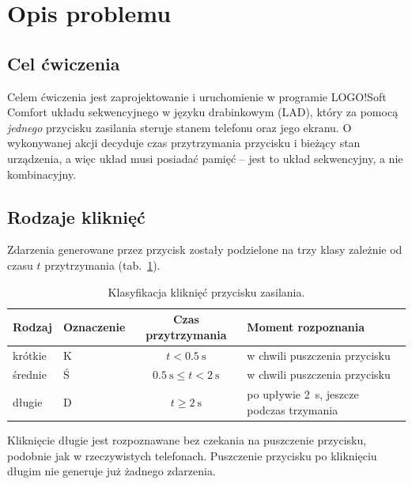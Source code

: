 \section{Opis problemu}
\label{sec:problem}

\subsection{Cel ćwiczenia}
Celem ćwiczenia jest zaprojektowanie i uruchomienie w programie
LOGO!Soft Comfort układu sekwencyjnego w języku drabinkowym (LAD),
który za pomocą \emph{jednego} przycisku zasilania steruje stanem
telefonu oraz jego ekranu. O wykonywanej akcji decyduje czas
przytrzymania przycisku i bieżący stan urządzenia, a więc układ musi
posiadać pamięć -- jest to układ sekwencyjny, a nie kombinacyjny.

\subsection{Rodzaje kliknięć}
Zdarzenia generowane przez przycisk zostały podzielone na trzy klasy
zależnie od czasu $t$ przytrzymania (tab.~\ref{tab:klikniecia}).

\begin{table}[H]
\centering
\caption{Klasyfikacja kliknięć przycisku zasilania.}
\label{tab:klikniecia}
\begin{tabular}{llcl}
\toprule
Rodzaj & Oznaczenie & Czas przytrzymania & Moment rozpoznania \\
\midrule
krótkie & K & $t < \SI{0,5}{\second}$ & w chwili puszczenia przycisku \\
średnie & Ś & $\SI{0,5}{\second} \le t < \SI{2}{\second}$ & w chwili puszczenia przycisku \\
długie  & D & $t \ge \SI{2}{\second}$ & po upływie \SI{2}{\second}, jeszcze podczas trzymania \\
\bottomrule
\end{tabular}
\end{table}

Kliknięcie długie jest rozpoznawane bez czekania na puszczenie
przycisku, podobnie jak w rzeczywistych telefonach. Puszczenie
przycisku po kliknięciu długim nie generuje już żadnego zdarzenia.

